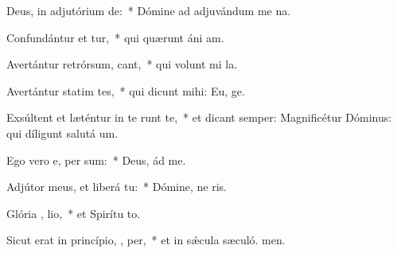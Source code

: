 \item Deus, in adjutórium  de:~* Dómine ad adjuvándum me na.
\item Confundántur et tur,~* qui quærunt áni am.
\item Avertántur retrórsum,  cant,~* qui volunt mi la.
\item Avertántur statim tes,~* qui dicunt mihi: Eu, ge.
\item Exsúltent et læténtur in te   runt te,~* et dicant semper: Magnificétur Dóminus: qui díligunt salutá um.
\item Ego vero e,  per sum:~* Deus, ád me.
\item Adjútor meus, et liberá   tu:~* Dómine, ne ris.
\item Glória ,  lio,~* et Spirítu to.
\item Sicut erat in princípio,  ,  per,~* et in sǽcula sæculó. men.
